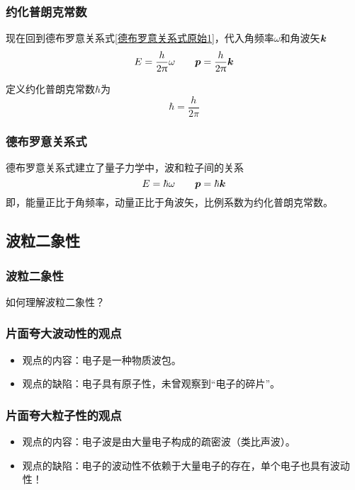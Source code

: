 \begin{frame}
    \frametitle{约化普朗克常数}
    现在回到德布罗意关系式\eqref{德布罗意关系式原始1}，代入角频率$\omega$和角波矢$\vb*{k}$
    \begin{equation}
        E=\frac{h}{2\uppi}\omega\qquad
        \vb*{p}=\frac{h}{2\uppi}\vb*{k}\label{德布罗意关系式原始2}
    \end{equation}
    \begin{definition}[约化普朗克常数]
        定义约化普朗克常数$\hbar$为
        \begin{equation}
            \hbar=\frac{h}{2\pi}
        \end{equation}
    \end{definition}
\end{frame}

\begin{frame}
    \frametitle{德布罗意关系式}
    \begin{theorem}[德布罗意关系式]
        德布罗意关系式建立了量子力学中，波和粒子间的关系
        \begin{equation}
            E=\hbar\omega\qquad
            \vb*{p}=\hbar\vb*{k}
        \end{equation}
        即，能量正比于角频率，动量正比于角波矢，比例系数为约化普朗克常数。
    \end{theorem}
\end{frame}

\subsection{波粒二象性}

\begin{frame}
    \frametitle{波粒二象性}
    \begin{center}
        如何理解波粒二象性？
    \end{center}
\end{frame}

\begin{frame}
    \frametitle{片面夸大波动性的观点}
    \begin{itemize}
        \item 观点的内容：电子是一种物质波包。
        \item 观点的缺陷：电子具有原子性，未曾观察到“电子的碎片”。
    \end{itemize}
\end{frame}

\begin{frame}
    \frametitle{片面夸大粒子性的观点}
    \begin{itemize}
        \item 观点的内容：电子波是由大量电子构成的疏密波（类比声波）。
        \item 观点的缺陷：电子的波动性不依赖于大量电子的存在，单个电子也具有波动性！
    \end{itemize}
\end{frame}


